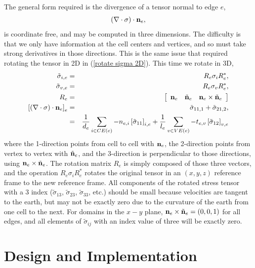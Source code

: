 \documentclass[11pt]{report}
\begin{document}
The general form required is the divergence of a tensor normal to edge $e$,
\begin{equation}
(\nabla\cdot\sigma)\cdot{\bf n}_e,
\end{equation}
is coordinate free, and may be computed in three dimensions.  The difficulty is that we only have information at the cell centers and vertices, and so must take strong derivatives in those directions.  This is the same issue that required rotating the tensor in 2D in (\ref{rotate sigma 2D}).  This time we rotate in 3D,
\begin{eqnarray}
\tilde{\sigma}_{i,e} &=& R_e\sigma_i R_e^*,
\\
\tilde{\sigma}_{v,e} &=& R_e\sigma_v R_e^*,
\\
R_e &=& \left[ 
\begin{array}{ccc}
{\bf n}_e & \tilde{\bf n}_e & {\bf n}_e\times\tilde{\bf n}_e  
\end{array}
\right]
\\
\left[(\nabla\cdot\sigma)\cdot{\bf n}_e\right]_e &=& \tilde\sigma_{11,1} + \tilde\sigma_{21,2},
\\
 &=& \frac{1}{d_e} \sum_{i\in CE(e)}-n_{e,i}\left[\tilde\sigma_{11}\right]_{i,e}
   + \frac{1}{l_e} \sum_{v\in VE(e)}-t_{e,v}\left[\tilde\sigma_{12}\right]_{v,e}
\end{eqnarray}
where the 1-direction points from cell to cell with ${\bf n}_e$, the 2-direction points from vertex to vertex with $\tilde{\bf n}_e$, and the 3-direction is perpendicular to those directions, using ${\bf n}_e\times\tilde{\bf n}_e$.  The rotation matrix $R_e$ is simply composed of those three vectors, and the operation $R_e\sigma_i R_e^*$ rotates the original tensor in an $(x,y,z)$ reference frame to the new reference frame.  All components of the rotated stress tensor with a 3 index ($\tilde\sigma_{13}$, $\tilde\sigma_{23}$, $\tilde\sigma_{33}$, etc.) should be small because velocities are tangent to the earth, but may not be exactly zero due to the curvature of the earth from one cell to the next.  For domains in the $x-y$ plane, ${\bf n}_e\times\tilde{\bf n}_e=(0,0,1)$ for all edges, and all elements of $\tilde\sigma_{ij}$ with an index value of three will be exactly zero.



\chapter{Design and Implementation}
\end{document}
